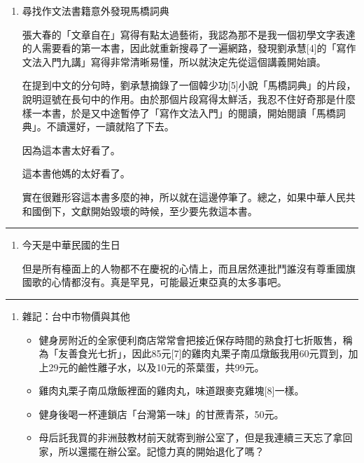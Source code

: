 \documentclass[
]{article}
\providecommand{\tightlist}{%
  \setlength{\itemsep}{0pt}\setlength{\parskip}{0pt}}
\begin{document}
\begin{enumerate}
\def\labelenumi{\arabic{enumi}.}
\setcounter{enumi}{1}
\item
  尋找作文法書籍意外發現馬橋詞典

  張大春的「文章自在」寫得有點太過藝術，我認為那不是我一個初學文字表達的人需要看的第一本書，因此就重新搜尋了一遍網路，發現劉承慧{[}4{]}的「寫作文法入門九講」寫得非常清晰易懂，所以就決定先從這個講義開始讀。

  在提到中文的分句時，劉承慧摘錄了一個韓少功{[}5{]}小說「馬橋詞典」的片段，說明逗號在長句中的作用。由於那個片段寫得太鮮活，我忍不住好奇那是什麼樣一本書，於是又中途暫停了「寫作文法入門」的閱讀，開始閱讀「馬橋詞典」。不讀還好，一讀就陷了下去。

  因為這本書太好看了。

  這本書他媽的太好看了。

  實在很難形容這本書多麼的神，所以就在這邊停筆了。總之，如果中華人民共和國倒下，文獻開始毀壞的時候，至少要先救這本書。
\end{enumerate}

\begin{center}\rule{0.5\linewidth}{\linethickness}\end{center}

\begin{enumerate}
\def\labelenumi{\arabic{enumi}.}
\setcounter{enumi}{2}
\item
  今天是中華民國的生日

  但是所有檯面上的人物都不在慶祝的心情上，而且居然連批鬥誰沒有尊重國旗國歌的心情都沒有。真是罕見，可能最近東亞真的太多事吧。
\end{enumerate}

\begin{center}\rule{0.5\linewidth}{\linethickness}\end{center}

\begin{enumerate}
\def\labelenumi{\arabic{enumi}.}
\setcounter{enumi}{3}
\item
  雜記：台中市物價與其他

  \begin{itemize}
  \tightlist
  \item
    健身房附近的全家便利商店常常會把接近保存時間的熟食打七折販售，稱為「友善食光七折」，因此85元{[}7{]}的雞肉丸栗子南瓜燉飯我用60元買到，加上29元的鹼性離子水，以及10元的茶葉蛋，共99元。
  \item
    雞肉丸栗子南瓜燉飯裡面的雞肉丸，味道跟麥克雞塊{[}8{]}一樣。
  \item
    健身後喝一杯連鎖店「台灣第一味」的甘蔗青茶，50元。
  \item
    母后託我買的非洲鼓教材前天就寄到辦公室了，但是我連續三天忘了拿回家，所以還擺在辦公室。記憶力真的開始退化了嗎？
  \end{itemize}
\end{enumerate}
\end{document}
